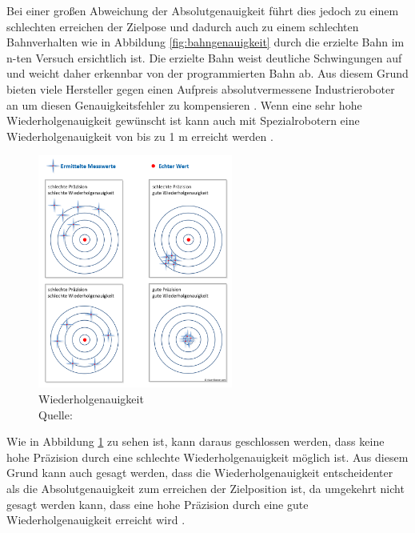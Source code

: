 Bei einer großen Abweichung der Absolutgenauigkeit führt dies jedoch zu einem schlechten erreichen der Zielpose und dadurch auch zu einem schlechten Bahnverhalten wie in Abbildung \ref{fig:bahngenauigkeit} durch die erzielte Bahn im n-ten Versuch ersichtlich ist. Die erzielte Bahn weist deutliche Schwingungen auf und weicht daher erkennbar von der programmierten Bahn ab. Aus diesem Grund bieten viele Hersteller gegen einen Aufpreis absolutvermessene Industrieroboter an um diesen Genauigkeitsfehler zu kompensieren \cite[29\psq]{pott_industrielle_2019}. Wenn eine sehr hohe Wiederholgenauigkeit gewünscht ist kann auch mit Spezialrobotern eine Wiederholgenauigkeit von bis zu 1 \si{\micro}m erreicht werden \cite{genauigkeit_nodate}.

\begin{figure}[htb]
	\centering
	\includegraphics[width=0.57\textwidth]{images/stand_der_technik/wiederholgenauigkeit}
	\caption[Wiederholgenauigkeit]{Wiederholgenauigkeit \\Quelle: \cite{prazision_nodate}}
	\label{fig:wiederholgenauigkeit}
\end{figure}
\FloatBarrier

Wie in Abbildung \ref{fig:wiederholgenauigkeit} zu sehen ist, kann daraus geschlossen werden, dass keine hohe Präzision durch eine schlechte Wiederholgenauigkeit möglich ist. Aus diesem Grund kann auch gesagt werden, dass die Wiederholgenauigkeit entscheidenter als die Absolutgenauigkeit zum erreichen der Zielposition ist, da umgekehrt nicht gesagt werden kann, dass eine hohe Präzision durch eine gute Wiederholgenauigkeit erreicht wird \cite{genauigkeit_nodate}.






